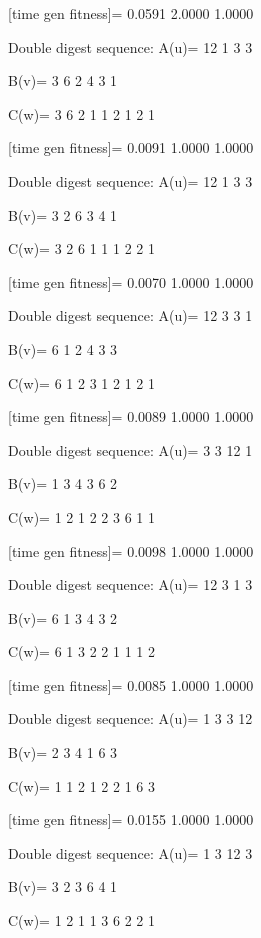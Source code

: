 [time gen fitness]=
    0.0591    2.0000    1.0000

Double digest sequence:
A(u)=
    12     1     3     3

B(v)=
     3     6     2     4     3     1

C(w)=
     3     6     2     1     1     2     1     2     1

[time gen fitness]=
    0.0091    1.0000    1.0000

Double digest sequence:
A(u)=
    12     1     3     3

B(v)=
     3     2     6     3     4     1

C(w)=
     3     2     6     1     1     1     2     2     1

[time gen fitness]=
    0.0070    1.0000    1.0000

Double digest sequence:
A(u)=
    12     3     3     1

B(v)=
     6     1     2     4     3     3

C(w)=
     6     1     2     3     1     2     1     2     1

[time gen fitness]=
    0.0089    1.0000    1.0000

Double digest sequence:
A(u)=
     3     3    12     1

B(v)=
     1     3     4     3     6     2

C(w)=
     1     2     1     2     2     3     6     1     1

[time gen fitness]=
    0.0098    1.0000    1.0000

Double digest sequence:
A(u)=
    12     3     1     3

B(v)=
     6     1     3     4     3     2

C(w)=
     6     1     3     2     2     1     1     1     2

[time gen fitness]=
    0.0085    1.0000    1.0000

Double digest sequence:
A(u)=
     1     3     3    12

B(v)=
     2     3     4     1     6     3

C(w)=
     1     1     2     1     2     2     1     6     3

[time gen fitness]=
    0.0155    1.0000    1.0000

Double digest sequence:
A(u)=
     1     3    12     3

B(v)=
     3     2     3     6     4     1

C(w)=
     1     2     1     1     3     6     2     2     1


